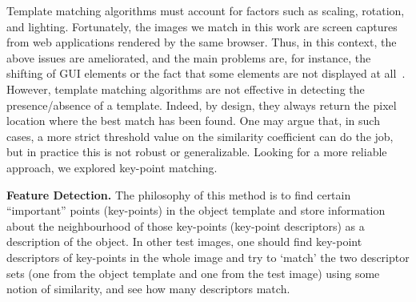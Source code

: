 Template matching algorithms must account for factors such as scaling, rotation, and lighting. Fortunately, the images we match in this work are screen captures from web applications rendered by the same browser. Thus, in this context, the above issues are ameliorated, and the main problems are, for instance, the shifting of GUI elements or the fact that some elements are not displayed at all~\cite{}.
% 
However, template matching algorithms are not effective in detecting the presence/absence of a template. Indeed, by design, they always return the pixel location where the best match has been found. One may argue that, in such cases, a more strict threshold value on the similarity coefficient can do the job, but in practice this is not robust or generalizable. Looking for a more reliable approach, we explored key-point matching.

\noindent
\textbf{Feature Detection.}
The philosophy of this method is to find certain ``important'' points (key-points) in the object template and store information about the neighbourhood of those key-points (key-point descriptors) as a description of the object. In other test images, one should find key-point descriptors of key-points in the whole image and try to `match' the two descriptor sets (one from the object template and one from the test image) using some notion of similarity, and see how many descriptors match.



